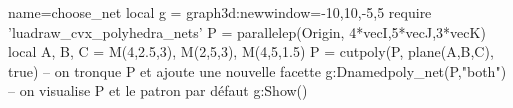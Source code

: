 \begin{luadraw}{name=choose_net}
local g = graph3d:new{window={-10,10,-5,5}}
require 'luadraw_cvx_polyhedra_nets'
P = parallelep(Origin, 4*vecI,5*vecJ,3*vecK)
local A, B, C = M(4,2.5,3), M(2,5,3), M(4,5,1.5)
P = cutpoly(P, plane(A,B,C), true) -- on tronque P et ajoute une nouvelle facette
g:Dnamedpoly_net(P,"both") -- on visualise P et le patron par défaut
g:Show()
\end{luadraw}
